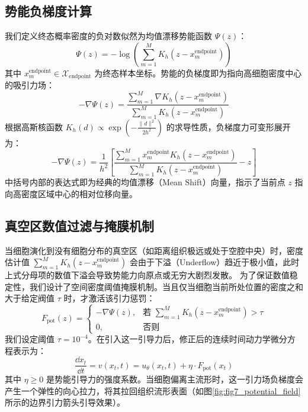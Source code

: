 \subsection{势能负梯度计算}
我们定义终态概率密度的负对数似然为均值漂移势能函数 $\Psi(z)$：
\begin{equation}
    \Psi(z) = -\log \left( \sum_{m=1}^M K_h(z - x_m^{\text{endpoint}}) \right)
\end{equation}
其中 $x_m^{\text{endpoint}} \in \mathcal{X}_{\text{endpoint}}$ 为终态样本坐标。势能的负梯度即为指向高细胞密度中心的吸引力场：
\begin{equation}
    -\nabla \Psi(z) = \frac{\sum_{m=1}^M \nabla K_h(z - x_m^{\text{endpoint}})}{\sum_{m=1}^M K_h(z - x_m^{\text{endpoint}})}
\end{equation}
根据高斯核函数 $K_h(d) \propto \exp(-\frac{\|d\|^2}{2h^2})$ 的求导性质，负梯度力可变形展开为：
\begin{equation}
    -\nabla \Psi(z) = \frac{1}{h^2} \left[ \frac{\sum_{m=1}^M x_m^{\text{endpoint}} K_h(z - x_m^{\text{endpoint}})}{\sum_{m=1}^M K_h(z - x_m^{\text{endpoint}})} - z \right]
\end{equation}
中括号内部的表达式即为经典的均值漂移（Mean Shift）向量，指示了当前点 $z$ 指向高密度区域中心的相对位移向量。

\subsection{真空区数值过滤与掩膜机制}
当细胞演化到没有细胞分布的真空区（如距离组织极远或处于空腔中央）时，密度估计值 $\sum_{m=1}^M K_h(z - x_m^{\text{endpoint}})$ 会由于下溢（Underflow）趋近于极小值，此时上式分母项的数值下溢会导致势能力向原点或无穷大剧烈发散。
为了保证数值稳定性，我们设计了空间密度阈值掩膜机制。当且仅当细胞当前所处位置的密度之和大于给定阀值 $\tau$ 时，才激活该引力惩罚：
\begin{equation}
    F_{\text{pot}}(z) = \begin{cases}
        -\nabla \Psi(z), & \text{若 } \sum_{m=1}^M K_h(z - x_m^{\text{endpoint}}) > \tau \\
        0, & \text{否则}
    \end{cases}
\end{equation}
我们设定阈值 $\tau = 10^{-4}$。在引入这一引导力后，修正后的连续时间动力学微分方程表示为：
\begin{equation}
    \frac{\dd x_t}{\dd t} = v(x_t, t) = u_\theta(x_t, t) + \eta \cdot F_{\text{pot}}(x_t)
\end{equation}
其中 $\eta \ge 0$ 是势能引导力的强度系数。当细胞偏离主流形时，这一引力场负梯度会产生一个弹性的向心拉力，将其拉回组织流形表面（如图\ref{fig:fig7_potential_field}所示的边界引力箭头引导效果）。

